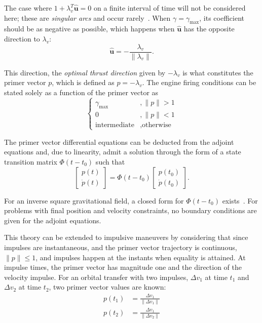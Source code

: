 The case where \(1 + \lambda_v^T \hat{\mathbf{u}} = 0\) on a finite interval of time will not be considered here; these are \textit{singular arcs} and occur rarely~\cite{singular_arcs}. When \(\gamma = \gamma_{\max}\), its coefficient should be as negative as possible, which happens when \(\hat{\mathbf{u}}\) has the opposite direction to \(\lambda_v\):
\begin{equation}
    \hat{\mathbf{u}} = - \frac{\lambda_v}{\lVert \lambda_v \rVert}.
\end{equation}

This direction, the \textit{optimal thrust direction} given by \(-\lambda_v\) is what constitutes the primer vector \(p\), which is defined as \(p = -\lambda_v\). The engine firing conditions can be stated solely as a function of the primer vector as~\cite{Conway_2010}
\begin{equation}
    \begin{cases}
        \gamma_{\max}&, \lVert p \rVert > 1 \\
        0&, \lVert p \rVert < 1 \\
        \text{intermediate}&, \text{otherwise}
    \end{cases}
\end{equation}

The primer vector differential equations can be deducted from the adjoint equations and, due to linearity, admit a solution through the form of a state transition matrix \(\Phi(t - t_0)\) such that
\begin{equation}
    \begin{bmatrix}
        p(t) \\ \dot{p}(t)
    \end{bmatrix} = \Phi(t - t_0) \begin{bmatrix}
        p(t_0) \\ \dot{p}(t_0)
    \end{bmatrix}.
\end{equation}

For an inverse square gravitational field, a closed form for \(\Phi(t-t_0)\) exists~\cite{glandorf_transition_matrix}. For problems with final position and velocity constraints, no boundary conditions are given for the adjoint equations.

This theory can be extended to impulsive maneuvers by considering that since impulses are instantaneous, and the primer vector trajectory is continuous, \(\lVert p \rVert \leq 1\), and impulses happen at the instants when equality is attained. At impulse times, the primer vector has magnitude one and the direction of the velocity impulse. For an orbital transfer with two impulses, \(\Delta v_1\) at time \(t_1\) and \(\Delta v_2\) at time \(t_2\), two primer vector values are known:
\begin{align}
    p(t_1) &= \frac{\Delta v_1}{\lVert \Delta v_1 \rVert} \\
    p(t_2) &= \frac{\Delta v_1}{\lVert \Delta v_2 \rVert}
\end{align}

